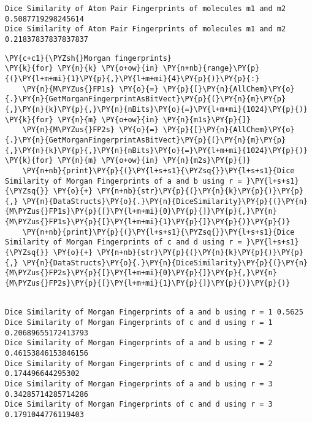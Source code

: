     \begin{Verbatim}[commandchars=\\\{\}]
Dice Similarity of Atom Pair Fingerprints of molecules m1 and m2
0.5087719298245614
Dice Similarity of Atom Pair Fingerprints of molecules m1 and m2
0.21837837837837837
    \end{Verbatim}

    \begin{tcolorbox}[breakable, size=fbox, boxrule=1pt, pad at break*=1mm,colback=cellbackground, colframe=cellborder]
\begin{Verbatim}[commandchars=\\\{\}]
\PY{c+c1}{\PYZsh{}Morgan fingerprints}
\PY{k}{for} \PY{n}{k} \PY{o+ow}{in} \PY{n+nb}{range}\PY{p}{(}\PY{l+m+mi}{1}\PY{p}{,}\PY{l+m+mi}{4}\PY{p}{)}\PY{p}{:}
    \PY{n}{M\PYZus{}FP1s} \PY{o}{=} \PY{p}{[}\PY{n}{AllChem}\PY{o}{.}\PY{n}{GetMorganFingerprintAsBitVect}\PY{p}{(}\PY{n}{m}\PY{p}{,}\PY{n}{k}\PY{p}{,}\PY{n}{nBits}\PY{o}{=}\PY{l+m+mi}{1024}\PY{p}{)} \PY{k}{for} \PY{n}{m} \PY{o+ow}{in} \PY{n}{m1s}\PY{p}{]}
    \PY{n}{M\PYZus{}FP2s} \PY{o}{=} \PY{p}{[}\PY{n}{AllChem}\PY{o}{.}\PY{n}{GetMorganFingerprintAsBitVect}\PY{p}{(}\PY{n}{m}\PY{p}{,}\PY{n}{k}\PY{p}{,}\PY{n}{nBits}\PY{o}{=}\PY{l+m+mi}{1024}\PY{p}{)} \PY{k}{for} \PY{n}{m} \PY{o+ow}{in} \PY{n}{m2s}\PY{p}{]}
    \PY{n+nb}{print}\PY{p}{(}\PY{l+s+s1}{\PYZsq{}}\PY{l+s+s1}{Dice Similarity of Morgan Fingerprints of a and b using r = }\PY{l+s+s1}{\PYZsq{}} \PY{o}{+} \PY{n+nb}{str}\PY{p}{(}\PY{n}{k}\PY{p}{)}\PY{p}{,} \PY{n}{DataStructs}\PY{o}{.}\PY{n}{DiceSimilarity}\PY{p}{(}\PY{n}{M\PYZus{}FP1s}\PY{p}{[}\PY{l+m+mi}{0}\PY{p}{]}\PY{p}{,}\PY{n}{M\PYZus{}FP1s}\PY{p}{[}\PY{l+m+mi}{1}\PY{p}{]}\PY{p}{)}\PY{p}{)}
    \PY{n+nb}{print}\PY{p}{(}\PY{l+s+s1}{\PYZsq{}}\PY{l+s+s1}{Dice Similarity of Morgan Fingerprints of c and d using r = }\PY{l+s+s1}{\PYZsq{}} \PY{o}{+} \PY{n+nb}{str}\PY{p}{(}\PY{n}{k}\PY{p}{)}\PY{p}{,} \PY{n}{DataStructs}\PY{o}{.}\PY{n}{DiceSimilarity}\PY{p}{(}\PY{n}{M\PYZus{}FP2s}\PY{p}{[}\PY{l+m+mi}{0}\PY{p}{]}\PY{p}{,}\PY{n}{M\PYZus{}FP2s}\PY{p}{[}\PY{l+m+mi}{1}\PY{p}{]}\PY{p}{)}\PY{p}{)}
    
\end{Verbatim}
\end{tcolorbox}

    \begin{Verbatim}[commandchars=\\\{\}]
Dice Similarity of Morgan Fingerprints of a and b using r = 1 0.5625
Dice Similarity of Morgan Fingerprints of c and d using r = 1
0.20689655172413793
Dice Similarity of Morgan Fingerprints of a and b using r = 2
0.46153846153846156
Dice Similarity of Morgan Fingerprints of c and d using r = 2 0.174496644295302
Dice Similarity of Morgan Fingerprints of a and b using r = 3
0.34285714285714286
Dice Similarity of Morgan Fingerprints of c and d using r = 3 0.1791044776119403
    \end{Verbatim}

    \begin{tcolorbox}[breakable, size=fbox, boxrule=1pt, pad at break*=1mm,colback=cellbackground, colframe=cellborder]
\begin{Verbatim}[commandchars=\\\{\}]

\end{Verbatim}
\end{tcolorbox}

